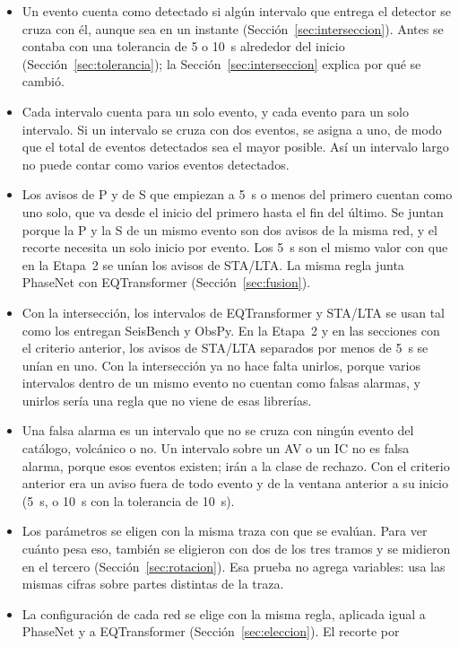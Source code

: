 \documentclass[11pt,a4paper,oneside,spanish,oldfontcommands]{memoir}
\begin{document}
\begin{itemize}
\item Un evento cuenta como detectado si algún intervalo que entrega el detector
  se cruza con él, aunque sea en un instante (Sección~\ref{sec:interseccion}).  Antes se contaba con una tolerancia de 5 o 10~s alrededor del inicio
  (Sección~\ref{sec:tolerancia}); la Sección~\ref{sec:interseccion} explica
  por qué se cambió.
\item Cada intervalo cuenta para un solo evento, y cada evento para un solo
  intervalo. Si un intervalo se cruza con dos eventos, se asigna a uno, de modo  que el total de eventos detectados sea el mayor posible. Así un intervalo
  largo no puede contar como varios eventos detectados.
\item Los avisos de P y de S que empiezan a 5~s o menos del primero cuentan como  uno solo, que va desde el inicio del primero hasta el fin del último. Se
  juntan porque la P y la S de un mismo evento son dos avisos de la misma red, y
  el recorte necesita un solo inicio por evento. Los 5~s son el mismo valor con
  que en la Etapa~2 se unían los avisos de STA/LTA. La misma regla junta
  PhaseNet con EQTransformer (Sección~\ref{sec:fusion}).
\item Con la intersección, los intervalos de EQTransformer y STA/LTA se usan tal
  como los entregan SeisBench y ObsPy. En la Etapa~2 y en las secciones con el  criterio anterior, los avisos de STA/LTA separados por menos de 5~s se unían en
  uno. Con la intersección ya no hace falta unirlos, porque varios intervalos
  dentro de un mismo evento no cuentan como falsas alarmas, y unirlos sería una
  regla que no viene de esas librerías.
\item Una falsa alarma es un intervalo que no se cruza con ningún evento del  catálogo, volcánico o no. Un intervalo sobre un AV o un IC no es falsa alarma,
  porque esos eventos existen; irán a la clase de rechazo. Con el criterio anterior era un aviso fuera de todo
  evento y de la ventana anterior a su inicio (5~s, o 10~s con la tolerancia de
  10~s).
\item Los parámetros se eligen con la misma traza con que se evalúan. Para ver
  cuánto pesa eso, también se eligieron con dos de los tres tramos y se midieron
  en el tercero (Sección~\ref{sec:rotacion}). Esa prueba no agrega variables:
  usa las mismas cifras sobre partes distintas de la traza.
\item La configuración de cada red se elige con la misma regla, aplicada igual a
  PhaseNet y a EQTransformer (Sección~\ref{sec:eleccion}). El recorte por

\end{itemize}
\end{document}
